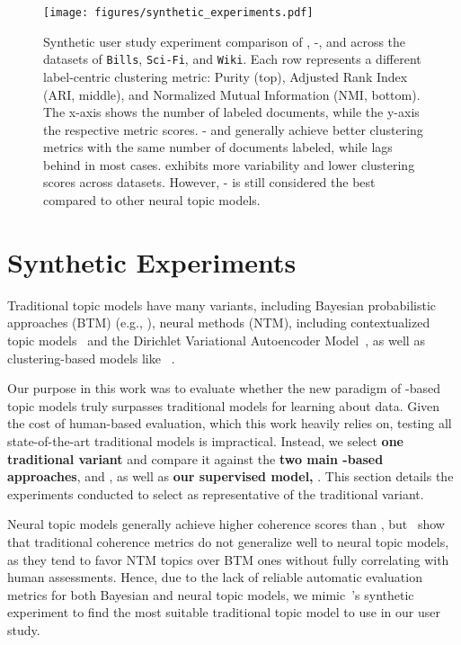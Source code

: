 \appendix
\begin{figure*}[!t]
    \centering
    \texttt{[image: figures/synthetic\_experiments.pdf]}
    \caption{
    Synthetic user study experiment comparison of {\color{bertopiccolor}\bertopic{}}, {\color{ldacolor}\lda{}-\mallet{}}, {\color{ctmcolor}\ctm{}} and {\color{dvaecolor}\dvae{}} across the datasets of \texttt{Bills}, \texttt{Sci-Fi}, and \texttt{Wiki}. Each row represents a different label-centric clustering metric: Purity (top), Adjusted Rank Index (ARI, middle), and Normalized Mutual Information (NMI, bottom). The x-axis shows the number of labeled documents, while the y-axis the respective metric scores. {\color{ldacolor}\lda{}-\mallet{}} and {\color{ctmcolor}\ctm{}} generally achieve better clustering metrics with the same number of documents labeled, while {\color{bertopiccolor}\bertopic{}} lags behind in most cases. {\color{dvaecolor}\dvae{}} exhibits more variability and lower clustering scores across datasets. However, {\color{ldacolor}\lda{}-\mallet{}} is still considered the best compared to other neural topic models.
    }
    \label{fig:synthetic_experiment}
\end{figure*}

\section{Synthetic Experiments}\label{appen:synthetic_experiments}
Traditional topic models have many variants, including Bayesian probabilistic approaches (BTM) (e.g., \lda{}), neural methods (NTM), including contextualized topic models~\cite[\ctm{},]{bianchi2020pre,kitty_CTM} and the Dirichlet Variational Autoencoder Model~\cite[\dvae{}]{burkhardt2019decoupling}, as well as clustering-based models like \bertopic{}~\cite{bertopicMark}.

%
Our purpose in this work was to evaluate whether the new paradigm of \mm{}-based topic models truly surpasses traditional models for learning about data. Given the cost of human-based evaluation, which this work heavily relies on, testing all state-of-the-art traditional models is impractical. Instead, we select {\bf one traditional variant} and compare it against the {\bf two main \mm{}-based approaches}, \topicgpt{} and \lloom{}, as well as {\bf our supervised \mm{} model, \bass{}}. This section details the experiments conducted to select \lda{} as representative of the traditional variant.

%
Neural topic models generally achieve higher coherence scores than \lda{}, but~\citet{hoyle2021automated, doogan-buntine-2021-topic, li-etal-2024-improving} show that traditional coherence metrics do not generalize well to neural topic models,  as they tend to favor NTM topics over BTM ones without fully correlating with human assessments.
%
Hence, due to the lack of reliable automatic evaluation metrics for both Bayesian and neural topic models, we mimic~\citet{li-etal-2024-improving}'s synthetic experiment to find the most suitable traditional topic model to use in our user study.

